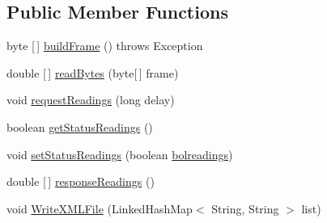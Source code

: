 \subsection*{Public Member Functions}
\begin{DoxyCompactItemize}
\item 
byte \mbox{[}$\,$\mbox{]} \hyperlink{classcom_1_1eneri_1_1scorpio__metertool_1_1devices_1_1_readings_a802faea37a618e66652c077455657cca}{build\+Frame} ()  throws Exception   
\item 
double \mbox{[}$\,$\mbox{]} \hyperlink{classcom_1_1eneri_1_1scorpio__metertool_1_1devices_1_1_readings_a5fea46ff0bf51863820045c33ad2f9d3}{read\+Bytes} (byte\mbox{[}$\,$\mbox{]} frame)
\item 
void \hyperlink{classcom_1_1eneri_1_1scorpio__metertool_1_1devices_1_1_readings_ab7bb31c0ddf76b17eaca3892cf8dbd71}{request\+Readings} (long delay)
\item 
boolean \hyperlink{classcom_1_1eneri_1_1scorpio__metertool_1_1devices_1_1_readings_a0ef82b24abab1d069277b7a39f10c95e}{get\+Status\+Readings} ()
\item 
void \hyperlink{classcom_1_1eneri_1_1scorpio__metertool_1_1devices_1_1_readings_ad292cb1aa7467acf3181d8d16cc41fb3}{set\+Status\+Readings} (boolean \hyperlink{classcom_1_1eneri_1_1scorpio__metertool_1_1devices_1_1_readings_a752ee032f1fb0b002a7a01bd7d4cb05e}{bolreadings})
\item 
double \mbox{[}$\,$\mbox{]} \hyperlink{classcom_1_1eneri_1_1scorpio__metertool_1_1devices_1_1_readings_ad9f8bf96ca274f81dac0519e6926d902}{response\+Readings} ()
\item 
void \hyperlink{classcom_1_1eneri_1_1scorpio__metertool_1_1devices_1_1_readings_adbb22b79abdefd3b40787cac20c82445}{Write\+X\+M\+L\+File} (Linked\+Hash\+Map$<$ String, String $>$ list)
\end{DoxyCompactItemize}
